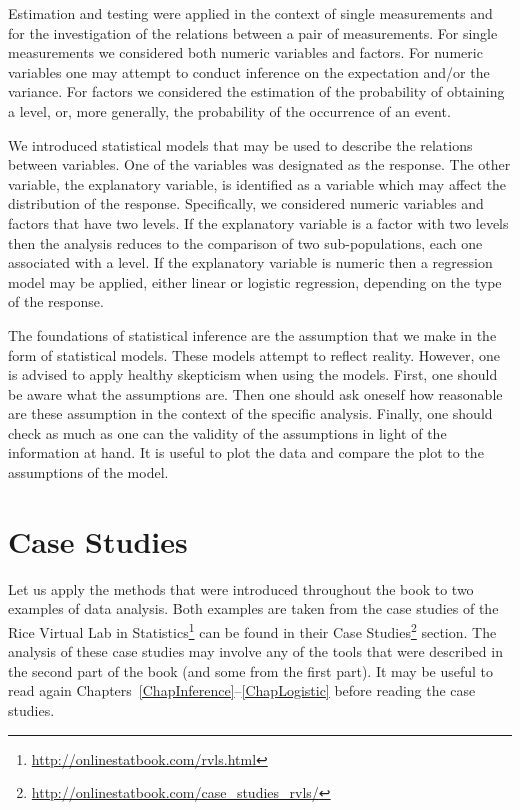 \documentclass[]{krantz}
\renewcommand{\href}[2]{#2\footnote{\url{#1}}}
\theoremstyle{definition}
\theoremstyle{definition}
\theoremstyle{definition}
\theoremstyle{remark}
\begin{document}
Estimation and testing were applied in the context of single
measurements and for the investigation of the relations between a pair
of measurements. For single measurements we considered both numeric
variables and factors. For numeric variables one may attempt to conduct
inference on the expectation and/or the variance. For factors we
considered the estimation of the probability of obtaining a level, or,
more generally, the probability of the occurrence of an event.

We introduced statistical models that may be used to describe the
relations between variables. One of the variables was designated as the
response. The other variable, the explanatory variable, is identified as
a variable which may affect the distribution of the response.
Specifically, we considered numeric variables and factors that have two
levels. If the explanatory variable is a factor with two levels then the
analysis reduces to the comparison of two sub-populations, each one
associated with a level. If the explanatory variable is numeric then a
regression model may be applied, either linear or logistic regression,
depending on the type of the response.

The foundations of statistical inference are the assumption that we make
in the form of statistical models. These models attempt to reflect
reality. However, one is advised to apply healthy skepticism when using
the models. First, one should be aware what the assumptions are. Then
one should ask oneself how reasonable are these assumption in the
context of the specific analysis. Finally, one should check as much as
one can the validity of the assumptions in light of the information at
hand. It is useful to plot the data and compare the plot to the
assumptions of the model.

\hypertarget{case-studies}{%
\section{Case Studies}\label{case-studies}}

Let us apply the methods that were introduced throughout the book to two
examples of data analysis. Both examples are taken from the case studies
of the \href{http://onlinestatbook.com/rvls.html}{Rice Virtual Lab in
Statistics} can be found in their
\href{http://onlinestatbook.com/case_studies_rvls/}{Case Studies} section.
The analysis of these case studies may involve any of the tools that
were described in the second part of the book (and some from the first
part). It may be useful to read again
Chapters~\ref{ChapInference}--\ref{ChapLogistic} before reading the case
studies.
\end{document}
